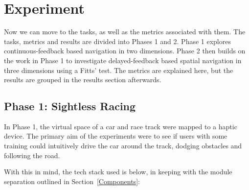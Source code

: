 \documentclass[
hidelinks,
12pt, %
oneside, %
english, %
doublespacing, %
headsepline, %
]{MastersDoctoralThesis} %
\begin{document}
\chapter{Experiment}
\label{Experiment}

Now we can move to the tasks, as well as the metrics associated with them. The tasks, metrics and results are divided into Phases 1 and 2. Phase 1 explores continuous-feedback based navigation in two dimensions. Phase 2 then builds on the work in Phase 1 to investigate delayed-feedback based spatial navigation in three dimensions using a Fitts' test. The metrics are explained here, but the results are grouped in the results section afterwards.

\section{Phase 1: Sightless Racing}

In Phase 1, the virtual space of a car and race track were mapped to a haptic device. The primary aim of the experiments were to see if users with some training could intuitively drive the car around the track, dodging obstacles and following the road.

With this in mind, the tech stack used is below, in keeping with the module separation outlined in Section~\ref{Components}:
\end{document}

